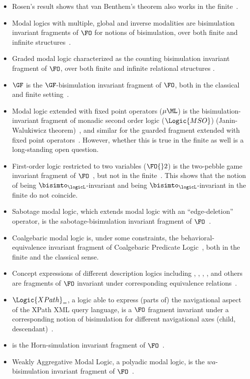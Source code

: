 \begin{itemize}
  \item Rosen's result shows that van Benthem's theorem also works in the finite~\cite{Rosen97}.
  \item Modal logics with multiple, global and inverse modalities are bisimulation invariant fragments of $\FO$ for notions of bisimulation, over both finite and infinite structures~\cite{Otto04}.
  \item Graded modal logic characterized as the counting bisimulation invariant fragment of $\FO$, over both finite and infinite relational structures \cite{derijke2000,otto2023}.
  \item $\GF$ is the $\GF$-bisimulation invariant fragment of $\FO$, both in the classical~\cite{AndrekaNB98} and finite setting~\cite{Otto2012}.
  \item Modal logic extended with fixed point operators ($\mu\ML$) is the bisimulation-invariant fragment of monadic second order logic ($\Logic{MSO}$) (Janin-Walukiwicz theorem)~\cite{janin1996}, and similar for the guarded fragment extended with fixed point operators~\cite{gradel2002}.
        However, whether this is true in the finite as well is a long-standing open question.
  \item First-order logic restricted to two variables ($\FO{}2$) is the two-pebble game invariant fragment of $\FO$~\cite{gradel1999}, but not in the finite~\cite{otto2017}.
        This shows that the notion of being $\bisimto_{\logicL}$-invariant and being $\bisimto_{\logicL}$-invariant in the finite do not coincide.
  \item Sabotage modal logic, which extends modal logic with an ``edge-deletion'' operator, is the sabotage-bisimulation invariant fragment of $\FO$~\cite{aucher2015}.
  \item Coalgebaric modal logic is, under some constraints, the behavioral-equivalence invariant fragment of Coalgebaric Predicate Logic~\cite{litak2012}, both in the finite and the classical sense.
  \item Concept expressions of different description logics including , , , ,  and others are fragments of $\FO$ invariant under corresponding equivalence relations~\cite{kurtonina1999, lutz2011, piro2013}.
  \item $\Logic{XPath}_{=}$, a logic able to express (parts of) the navigational aspect of the XPath XML query language, is a $\FO$ fragment invariant under a corresponding notion of bisimulation for different navigational axes (child, descendant)~\cite{figueira2015}.
  \item {} is the Horn-simulation invariant fragment of $\FO$~\cite{jung2019}.
  \item Weakly Aggregative Modal Logic, a polyadic modal logic, is the $wa$-bisimulation invariant fragment of $\FO$~\cite{liu2019}.
\end{itemize}

